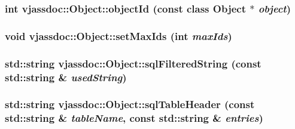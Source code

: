 \hypertarget{classvjassdoc_1_1Object_7da4025933552d2e896a8ea2534b3324}{
\subsubsection{\setlength{\rightskip}{0pt plus 5cm}int vjassdoc::Object::objectId (const class {\bf Object} $\ast$ {\em object})}}
\label{classvjassdoc_1_1Object_7da4025933552d2e896a8ea2534b3324}


\hypertarget{classvjassdoc_1_1Object_8edf943aa716a2da74d4f9f2c13e001b}{
\subsubsection{\setlength{\rightskip}{0pt plus 5cm}void vjassdoc::Object::setMaxIds (int {\em maxIds})}}
\label{classvjassdoc_1_1Object_8edf943aa716a2da74d4f9f2c13e001b}


\hypertarget{classvjassdoc_1_1Object_402f48ed33d2c82c1bccda774767ded3}{
\subsubsection{\setlength{\rightskip}{0pt plus 5cm}std::string vjassdoc::Object::sqlFilteredString (const std::string \& {\em usedString})}}
\label{classvjassdoc_1_1Object_402f48ed33d2c82c1bccda774767ded3}


\hypertarget{classvjassdoc_1_1Object_b229c2eb3c0c7d1e86d789986bffe3f1}{
\subsubsection{\setlength{\rightskip}{0pt plus 5cm}std::string vjassdoc::Object::sqlTableHeader (const std::string \& {\em tableName}, const std::string \& {\em entries})}}
\label{classvjassdoc_1_1Object_b229c2eb3c0c7d1e86d789986bffe3f1}


